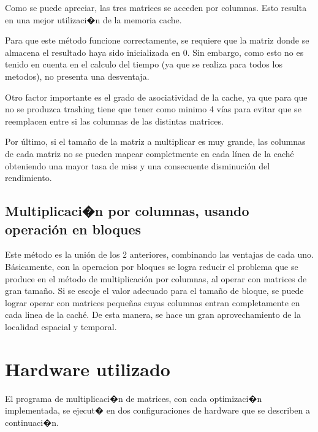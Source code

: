 \documentclass{article}
\begin{document}
Como se puede apreciar, las tres matrices se acceden por columnas. Esto resulta en una mejor utilizaci�n de la memoria cache.

Para que este método funcione correctamente, se requiere que la matriz donde se almacena el resultado haya sido inicializada en 0. Sin embargo, como esto no es tenido en cuenta en el calculo del tiempo (ya que se realiza para todos los metodos), no presenta una desventaja.

Otro factor importante es el grado de asociatividad de la cache, ya que para que no se produzca trashing tiene que tener como minimo 4 vías para evitar que se reemplacen entre si las columnas de las distintas matrices.

Por último, si el tamaño de la matriz a multiplicar es muy grande, las columnas de cada matriz no se pueden mapear completmente en cada línea de la caché obteniendo una mayor tasa de miss y una consecuente disminución del rendimiento.

\subsection{Multiplicaci�n por columnas, usando operación en bloques}

Este método es la unión de los 2 anteriores, combinando las ventajas de cada uno. Básicamente, con la operacion por bloques se logra reducir el problema que se produce en el método de multiplicación por columnas, al operar con matrices de gran tamaño. Si se escoje el valor adecuado para el tamaño de bloque, se puede lograr operar con matrices pequeñas cuyas columnas entran completamente en cada linea de la caché. De esta manera, se hace un gran aprovechamiento de la localidad espacial y temporal.

\section{Hardware utilizado}

El programa de multiplicaci�n de matrices, con cada optimizaci�n implementada, se ejecut� en dos configuraciones de hardware que se describen a continuaci�n.
\end{document}
